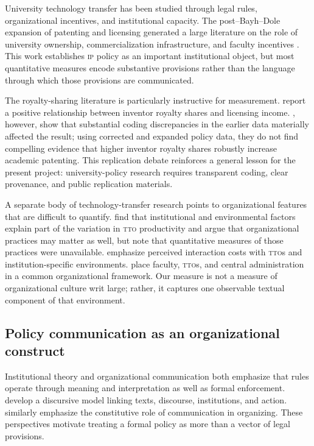 \documentclass[12pt]{article}
\newcommand{\IP}{\textsc{ip}}
\newcommand{\TTO}{\textsc{tto}}
\begin{document}
University technology transfer has been studied through legal rules, organizational incentives, and institutional capacity. The post--Bayh--Dole expansion of patenting and licensing generated a large literature on the role of university ownership, commercialization infrastructure, and faculty incentives \citep{Mowery2001,Mowery2004,Sampat2006}. This work establishes \IP{} policy as an important institutional object, but most quantitative measures encode substantive provisions rather than the language through which those provisions are communicated.

The royalty-sharing literature is particularly instructive for measurement. \citet{Lach2008} report a positive relationship between inventor royalty shares and licensing income. \citet{OuelletteTutt2020}, however, show that substantial coding discrepancies in the earlier data materially affected the result; using corrected and expanded policy data, they do not find compelling evidence that higher inventor royalty shares robustly increase academic patenting. This replication debate reinforces a general lesson for the present project: university-policy research requires transparent coding, clear provenance, and public replication materials.

A separate body of technology-transfer research points to organizational features that are difficult to quantify. \citet{Siegel2003} find that institutional and environmental factors explain part of the variation in \TTO{} productivity and argue that organizational practices may matter as well, but note that quantitative measures of those practices were unavailable. \citet{OwenSmithPowell2001} emphasize perceived interaction costs with \TTO{}s and institution-specific environments. \citet{Jensen2003} place faculty, \TTO{}s, and central administration in a common organizational framework. Our measure is not a measure of organizational culture writ large; rather, it captures one observable textual component of that environment.

\subsection{Policy communication as an organizational construct}

Institutional theory and organizational communication both emphasize that rules operate through meaning and interpretation as well as formal enforcement. \citet{Phillips2004} develop a discursive model linking texts, discourse, institutions, and action. \citet{Putnam2009} similarly emphasize the constitutive role of communication in organizing. These perspectives motivate treating a formal policy as more than a vector of legal provisions.
\end{document}
